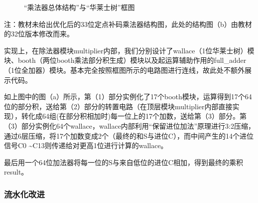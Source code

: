 \documentclass[11pt]{article}
\begin{document}
\begin{figure}[H]
  \centering
  \caption{“乘法器总体结构”与“华莱士树”框图}
\end{figure}

注：教材未给出优化后的33位定点补码乘法器结构图，此处的结构图（b）由教材的32位版本修改而来。

实现上，在除法器模块multiplier内部，我们分别设计了wallace（1位华莱士树）模块、booth（两位booth乘法部分积生成）模块以及起运算辅助作用的full_adder（1位全加器）模块。基本完全按照框图所示的电路图进行连线，故此处不额外展示代码。

如上图中的图（a）所示，第（1）部分实例化了17个booth模块，运算得到17个64位的部分积，送给第（2）部分的转置电路（在顶层模块multiplier内部直接实现），转化成64组(在部分积相加时)每一位上的17个加数，送给第（3）部分。第（3）部分实例化64个wallace，wallace内部利用“保留进位加法”原理进行3:2压缩，通过6层压缩，将17个加数变成2个（最终的和S与进位C），而中间产生的14个进位信号C0 \textasciitilde C13则传递给对更高1位进行计算的wallace。

最后用一个64位加法器将每一位的S与来自低位的进位C相加，得到最终的乘积result。

\subsubsection{流水化改进}
\end{document}
